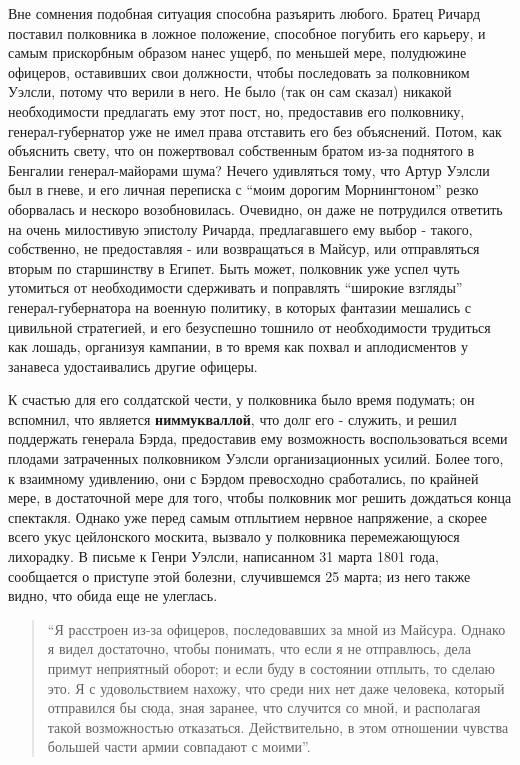 \documentclass[
  oneside,
  12pt,
  titlepage]{book}
\begin{document}
Вне сомнения подобная ситуация способна разъярить любого. Братец Ричард поставил полковника в ложное положение, способное погубить его карьеру, и самым прискорбным образом нанес ущерб, по меньшей мере, полудюжине офицеров, оставивших свои должности, чтобы последовать за полковником Уэлсли, потому что верили в него. Не было (так он сам сказал) никакой необходимости предлагать ему этот пост, но, предоставив его полковнику, генерал-губернатор уже не имел права отставить его без объяснений. Потом, как объяснить свету, что он пожертвовал собственным братом из-за поднятого в Бенгалии генерал-майорами шума? Нечего удивляться тому, что Артур Уэлсли был в гневе, и его личная переписка с ``моим дорогим Морнингтоном'' резко оборвалась и нескоро возобновилась. Очевидно, он даже не потрудился ответить на очень милостивую эпистолу Ричарда, предлагавшего ему выбор - такого, собственно, не предоставляя - или возвращаться в Майсур, или отправляться вторым по старшинству в Египет. Быть может, полковник уже успел чуть утомиться от необходимости сдерживать и поправлять ``широкие взгляды'' генерал-губернатора на военную политику, в которых фантазии мешались с цивильной стратегией, и его безуспешно тошнило от необходимости трудиться как лошадь, организуя кампании, в то время как похвал и аплодисментов у занавеса удостаивались другие офицеры.

К счастью для его солдатской чести, у полковника было время подумать; он вспомнил, что является \textbf{ниммукваллой}, что долг его - служить, и решил поддержать генерала Бэрда, предоставив ему возможность воспользоваться всеми плодами затраченных полковником Уэлсли организационных усилий. Более того, к взаимному удивлению, они с Бэрдом превосходно сработались, по крайней мере, в достаточной мере для того, чтобы полковник мог решить дождаться конца спектакля. Однако уже перед самым отплытием нервное напряжение, а скорее всего укус цейлонского москита, вызвало у полковника перемежающуюся лихорадку. В письме к Генри Уэлсли, написанном 31 марта 1801 года, сообщается о приступе этой болезни, случившемся 25 марта; из него также видно, что обида еще не улеглась.

\begin{quote}
``Я расстроен из-за офицеров, последовавших за мной из Майсура. Однако я видел достаточно, чтобы понимать, что если я не отправлюсь, дела примут неприятный оборот; и если буду в состоянии отплыть, то сделаю это. Я с удовольствием нахожу, что среди них нет даже человека, который отправился бы сюда, зная заранее, что случится со мной, и располагая такой возможностью отказаться. Действительно, в этом отношении чувства большей части армии совпадают с моими''.
\end{quote}
\end{document}
